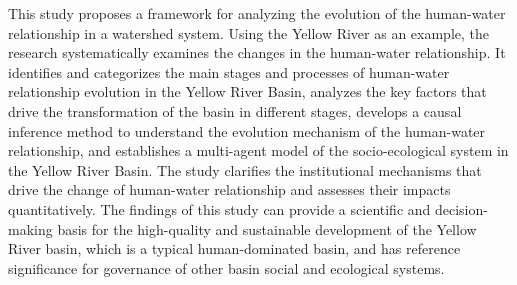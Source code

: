 \begin{eabstract}
  This study proposes a framework for analyzing the evolution of the human-water relationship in a watershed system. Using the Yellow River as an example, the research systematically examines the changes in the human-water relationship. 
  It identifies and categorizes the main stages and processes of human-water relationship evolution in the Yellow River Basin, analyzes the key factors that drive the transformation of the basin in different stages, develops a causal inference method to understand the evolution mechanism of the human-water relationship, and establishes a multi-agent model of the socio-ecological system in the Yellow River Basin. 
  The study clarifies the institutional mechanisms that drive the change of human-water relationship and assesses their impacts quantitatively. The findings of this study can provide a scientific and decision-making basis for the high-quality and sustainable development of the Yellow River basin, which is a typical human-dominated basin, and has reference significance for governance of other basin social and ecological systems.

\end{eabstract}


